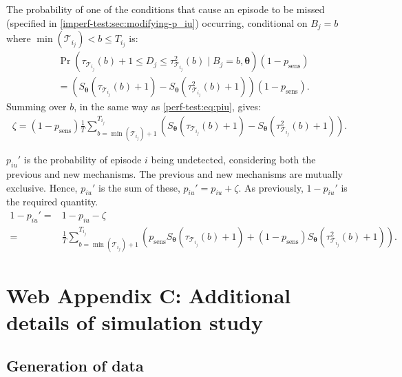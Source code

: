 \documentclass{article}
\DeclareMathOperator{\prob}{\mathrm{Pr}}
\renewcommand{\vec}[1]{\bm{#1}}
\newcommand{\psens}{p_\text{sens}}
\newcommand{\sched}{\mathcal{T}}
\begin{document}
The probability of one of the conditions that cause an episode to be missed (specified in \cref{imperf-test:sec:modifying-p_iu}) occurring, conditional on $B_j = b$ where $\min(\sched_{i_j}) < b \leq T_{i_j}$ is:
\begin{align}
&\prob \left(
    \tau_{\sched_{i_j}}(b) + 1 \leq D_j \leq \tau^2_{\sched_{i_j}}(b)
    \mid B_j = b, \vec{\theta} \right) (1 - \psens) \\
&= \left( S_{\vec{\theta}}(\tau_{\sched_{i_j}}(b) + 1) - S_{\vec{\theta}}(\tau^2_{\sched_{i_j}}(b) + 1) \right) (1 - \psens).
\end{align}
Summing over $b$, in the same way as \cref{perf-test:eq:piu}, gives:
\begin{align}
\zeta = (1 - p_\text{sens})\frac{1}{T} \sum_{b=\min(\sched_{i_j}) + 1}^{T_{i_j}} \left( S_{\vec{\theta}}(\tau_{\sched_{i_j}}(b) + 1) - S_{\vec{\theta}}(\tau^2_{\sched_{i_j}}(b) + 1) \right).
\label{imperf-test:eq:zeta}
\end{align}

$p_{iu}'$ is the probability of episode $i$ being undetected, considering both the previous and new mechanisms.
The previous and new mechanisms are mutually exclusive.
Hence, $p_{iu}'$ is the sum of these, $p_{iu}' = p_{iu} + \zeta$.
As previously, $1 - p_{iu}'$ is the required quantity.
\begin{align}
1 - p_{iu}'
=& 1 - p_{iu} - \zeta \\
=& \frac{1}{T} \sum_{b=\min(\sched_{i_j}) + 1}^{T_{i_j}} \left( p_\text{sens} S_{\vec{\theta}}(\tau_{\sched_{i_j}}(b) + 1) + (1 - p_\text{sens}) S_{\vec{\theta}}(\tau^2_{\sched_{i_j}}(b) + 1)\right).
\end{align}


\section{Web Appendix C: Additional details of simulation study}

\subsection{Generation of data} \label{sec:simulation-data}
\end{document}
